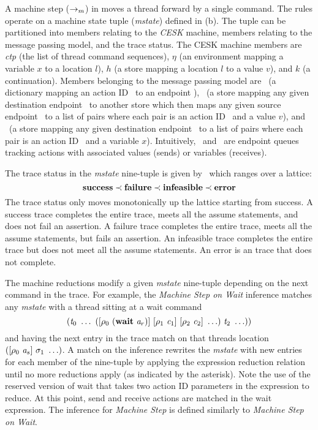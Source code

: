 A machine step ($\rightarrow_{m}$) in  moves a thread forward by a
single command.  The rules operate on a machine state tuple
(\textit{mstate}) defined in (b).  The tuple
can be partitioned into members relating to the \textit{CESK}
machine, members relating to the message passing model, and the trace status.  The CESK machine members are
\textit{ctp} (the list of thread command sequences), $\eta$ (an environment mapping a variable $x$ to a location $l$),
$h$ (a store mapping a location $l$ to a value $v$), and $k$ (a continuation).
Members belonging to the message passing model are 
\aidmap\ (a dictionary mapping an action ID \aid\ to an endpoint \ep),
\epsnd\ (a store mapping any given destination endpoint \dst\ to another store which then maps any given source endpoint \src\ to a list of pairs where each pair is an action ID \aid\ and a value $v$), and
\eprcv\ (a store mapping any given destination endpoint \dst\ to a list of pairs where each pair is an action ID \aid\ and a variable $x$).  Intuitively, \epsnd\ and \eprcv\ are endpoint queues tracking actions with associated values (sends) or variables (receives).

The trace status in the \textit{mstate} nine-tuple is given by 
\status\ which ranges over a lattice: 
\[\textbf{success} \prec \textbf{failure} \prec \textbf{infeasible} \prec \textbf{\ensuremath{\mathbf{error}}}\]
The trace status only moves monotonically up the lattice starting from
success.  A success trace completes the entire trace, meets all the
assume statements, and does not fail an assertion.  A failure trace
completes the entire trace, meets all the assume statements, but fails
an assertion.  An infeasible trace completes the entire trace but does
not meet all the assume statements.  An error is an trace that does
not complete.

The machine reductions modify a given \textit{mstate} nine-tuple
depending on the next command in the trace.  For example, the
\emph{Machine Step on Wait} inference matches any \textit{mstate} with
a thread sitting at a wait command
\[
(\mathit{t}_0~\ldots~([\rho_0~(\mathbf{wait}~\mathit{a}_r)]~[\rho_1~\mathit{c}_1]~[\rho_2~\mathit{c}_2]~\ldots)~\mathit{t}_2~\ldots))
\]
and having the next entry in the trace match on that threads location
$([\rho_0~\mathit{a}_s]~\sigma_1~\ldots)$.  A match on the inference
rewrites the \textit{mstate} with new entries for each member of the
nine-tuple by applying the expression reduction relation until no
more reductions apply (as indicated by the asterisk).  Note the use of
the reserved version of wait that takes two action ID parameters in
the expression to reduce.  At this point, send and receive actions are matched in the wait expression.  The inference for \textit{Machine Step} is
defined similarly to \emph{Machine Step on Wait}.

